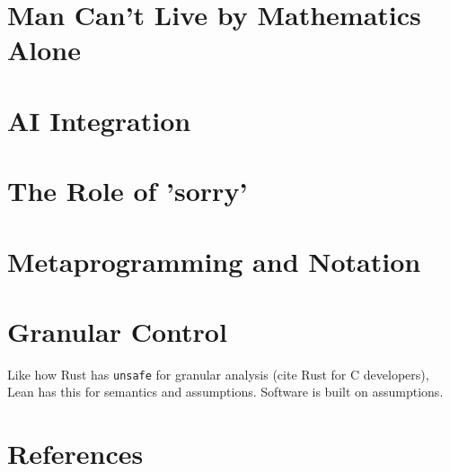 \documentclass{article}
\begin{document}
\section{Man Can't Live by Mathematics Alone}

\section{AI Integration}

\section{The Role of 'sorry'}

\section{Metaprogramming and Notation}

\section{Granular Control}
Like how Rust has \texttt{unsafe} for granular analysis (cite Rust for C developers),
Lean has this for semantics and assumptions. Software is built on assumptions.

\begin{ack}
\end{ack}

\section*{References}

{
  \small
}
\end{document}
